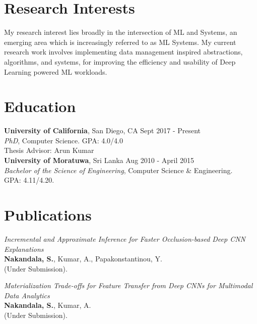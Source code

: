 \documentclass[margin]{res}
\begin{document}
\begin{resume}

\section{Research Interests}
My research interest lies broadly in the intersection of ML and Systems, an emerging area which is increasingly referred to as ML Systems. My current research work involves implementing data management inspired abstractions, algorithms, and systems, for improving the efficiency and usability of Deep Learning powered ML workloads.

\section{Education}
\textbf{University of California}, San Diego, CA \hfill Sept 2017 - Present
\\ 
{\sl PhD}, Computer Science. GPA: 4.0/4.0 
\\
Thesis Advisor: Arun Kumar
\vspace{2mm}
\\
\textbf{University of Moratuwa}, Sri Lanka \hfill Aug 2010 - April 2015
\\
{\sl Bachelor of the Science of Engineering}, Computer Science \& Engineering. \\ GPA: 4.11/4.20.

\section{Publications}
\par
\textit{Incremental and Approximate Inference for Faster Occlusion-based Deep CNN Explanations} \\
\textbf{Nakandala, S.}, Kumar, A., Papakonstantinou, Y. \\
(Under Submission).

\par
\textit{Materialization Trade-offs for Feature Transfer from Deep CNNs for Multimodal Data Analytics} \\
\textbf{Nakandala, S.}, Kumar, A. \\
(Under Submission).


\end{resume}
\end{document}
